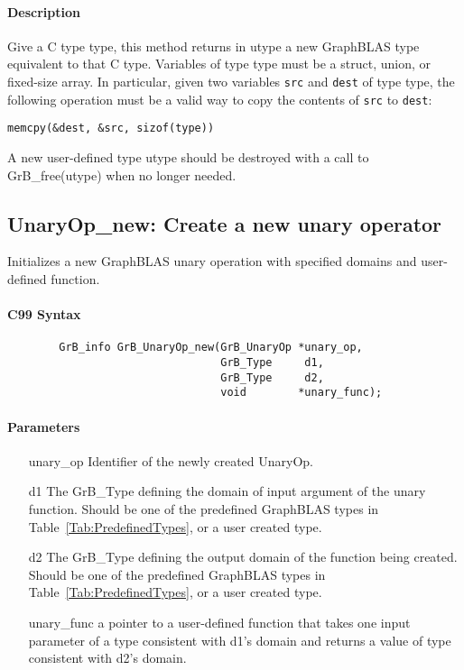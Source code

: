 \paragraph{Description}
Give a C type {\sf type}, this method returns in {\sf utype} a new GraphBLAS type equivalent to that C type.
Variables of type {\sf type} must be a struct, union, or fixed-size array. In particular, given two variables
{\tt src} and {\tt dest} of type {\sf type}, the following operation must be a valid way to copy the contents of
{\tt src} to {\tt dest}:

\begin{center}
{\tt memcpy(\&dest, \&src, sizof({\sf type}))}
\end{center}

A new user-defined type {\sf utype} should be destroyed with a call to {\sf GrB\_free(utype)} when no longer needed.

\subsection{{\sf UnaryOp\_new}: Create a new unary operator}

Initializes a new GraphBLAS unary operation with specified domains and user-defined function.


\paragraph{C99 Syntax}

\begin{verbatim}
        GrB_info GrB_UnaryOp_new(GrB_UnaryOp *unary_op,
                                 GrB_Type     d1,
                                 GrB_Type     d2,
                                 void        *unary_func);
\end{verbatim}

\paragraph{Parameters}

\begin{itemize}[leftmargin=1.1in]
    \item[{\sf unary\_op}]      Identifier of the newly created UnaryOp.
    \item[{\sf d1}]        The {\sf GrB\_Type} defining the domain of input argument of
    the unary function. Should be one of the predefined
    GraphBLAS types in Table~\ref{Tab:PredefinedTypes}, or a user created type.
    \item[{\sf d2}]       The {\sf GrB\_Type} defining the output domain of the function
    being created.  Should be one of the predefined
    GraphBLAS types in Table~\ref{Tab:PredefinedTypes}, or a user created type.
    \item[{\sf unary\_func}]     a pointer to a user-defined function that takes one input 
    parameter of a type consistent with {\sf d1}'s domain and returns a value of type consistent with {\sf d2}'s domain.
\end{itemize}


